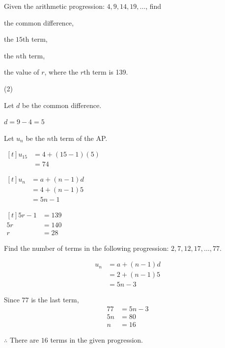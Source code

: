 \documentclass[11pt,a4paper]{book}
\begin{document}
\begin{example}

Given the arithmetic progression: $4,9,14,19,\ldots$, find

\begin{tasks}[label=(\alph*),label-width=3.5ex] 

\task  the common difference, 

\task  the $15\text{th}$ term,

\task  the $n\text{th}$ term,

\task  the value of $r$, where the $r\text{th}$ term is 139.

\end{tasks}

\Solution

\begin{tasks}[label=(\alph*),label-width=3.5ex] (2)

\task Let $d$ be the common difference.

$d=9-4=5$

\task  Let $u_{n}$ be the $n\text{th}$ term of the AP. 

$
\begin{aligned}[t]
u_{15} & =4+\left(15-1\right)\left(5\right)\\
 & =74
\end{aligned}
$

\task  
$
\begin{aligned}[t]
u_{n} & =a+\left(n-1\right)d\\
 & =4+\left(n-1\right)5\\
 & =5n-1
\end{aligned}
$


\task  
$
\begin{aligned}[t]
5r-1 & =139\\
5r & =140\\
r & =28
\end{aligned}
$


\end{tasks}

\end{example}

\begin{example}

Find the number of terms in the following progression: $2,7,12,17,\ldots,77$.

\Solution

\begin{align*}
u_{n} & =a+\left(n-1\right)d\\
 & =2+\left(n-1\right)5\\
 & =5n-3
\end{align*}

Since $77$ is the last term, 
\begin{align*}
77 & =5n-3\\
5n & =80\\
n & =16
\end{align*}

$\therefore$ There are $16$ terms in the given progression.

\end{example}
\end{document}
